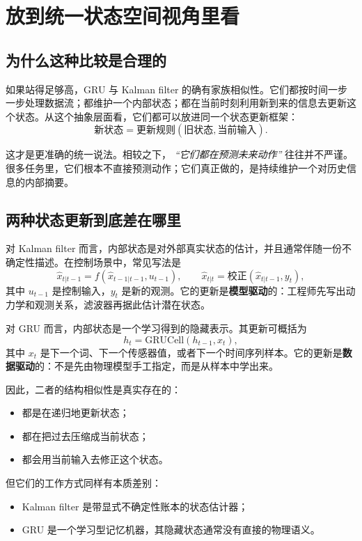 \documentclass[12pt,a4paper]{ctexart}
\begin{document}
\section{放到统一状态空间视角里看}

\subsection{为什么这种比较是合理的}

如果站得足够高，GRU 与 Kalman filter 的确有家族相似性。它们都按时间一步一步处理数据流；都维护一个内部状态；都在当前时刻利用新到来的信息去更新这个状态。从这个抽象层面看，它们都可以放进同一个状态更新框架：
\[
\text{新状态} = \text{更新规则}(\text{旧状态}, \text{当前输入}).
\]

这才是更准确的统一说法。相较之下，
\emph{“它们都在预测未来动作”}
往往并不严谨。很多任务里，它们根本不直接预测动作；它们真正做的，是持续维护一个对历史信息的内部摘要。

\subsection{两种状态更新到底差在哪里}

对 Kalman filter 而言，内部状态是对外部真实状态的估计，并且通常伴随一份不确定性描述。在控制场景中，常见写法是
\[
\hat{x}_{t|t-1} = f(\hat{x}_{t-1|t-1}, u_{t-1}),
\qquad
\hat{x}_{t|t} = \text{校正}(\hat{x}_{t|t-1}, y_t),
\]
其中 \(u_{t-1}\) 是控制输入，\(y_t\) 是新的观测。它的更新是\textbf{模型驱动}的：工程师先写出动力学和观测关系，滤波器再据此估计潜在状态。

对 GRU 而言，内部状态是一个学习得到的隐藏表示。其更新可概括为
\[
h_t = \text{GRUCell}(h_{t-1}, x_t),
\]
其中 \(x_t\) 是下一个词、下一个传感器值，或者下一个时间序列样本。它的更新是\textbf{数据驱动}的：不是先由物理模型手工指定，而是从样本中学出来。

因此，二者的结构相似性是真实存在的：
\begin{itemize}
  \item 都是在递归地更新状态；
  \item 都在把过去压缩成当前状态；
  \item 都会用当前输入去修正这个状态。
\end{itemize}

但它们的工作方式同样有本质差别：
\begin{itemize}
  \item Kalman filter 是带显式不确定性账本的状态估计器；
  \item GRU 是一个学习型记忆机器，其隐藏状态通常没有直接的物理语义。
\end{itemize}
\end{document}
